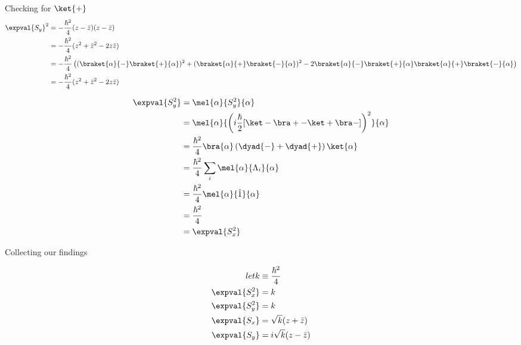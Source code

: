 \begin{answer}
\begin{answerpart}{Checking for \texorpdfstring{$\ket{+}$}{|+>}}
    \begin{equation}
      \begin{split}
        \expval{S_y}^2
        &= -\frac{\hbar^2}{4}(z - \bar{z})(z - \bar{z})\\
        &= -\frac{\hbar^2}{4}(z^2 + \bar{z}^2 - 2z\bar{z})\\
        &= -\frac{\hbar^2}{4}\left(
        (\braket{\alpha}{-}\braket{+}{\alpha})^2
        + (\braket{\alpha}{+}\braket{-}{\alpha})^2
        - 2
        \braket{\alpha}{-}\braket{+}{\alpha}
        \braket{\alpha}{+}\braket{-}{\alpha}
        \right)\\
        &= -\frac{\hbar^2}{4}(z^2 + \bar{z}^2 - 2z\bar{z})\\
      \end{split}
    \end{equation}

    \begin{equation}
      \begin{split}
        \expval{S_y^2}
        &= \mel{\alpha}{S_y^2}{\alpha}\\
        &= \mel{\alpha}{\left(i\frac{\hbar}{2} [\ket - \bra + - \ket + \bra - ]\right)^2}{\alpha}\\
        &=
        \frac{\hbar^2}{4}
        \bra{\alpha}
        \left(
        \dyad{-} + \dyad{+}
        \right)
        \ket{\alpha}
        \\
        &=
        \frac{\hbar^2}{4}
        \sum_i \mel{\alpha}{\Lambda_i}{\alpha}
        \\
        &=
        \frac{\hbar^2}{4}\mel{\alpha}{\hat{1}}{\alpha}
        \\
        &=
        \frac{\hbar^2}{4}
        \\
        &=
        \expval{S_x^2}
        \\
      \end{split}
    \end{equation}

    Collecting our findings
    
    \begin{equation}
      \begin{split}
        let k &\equiv \frac{\hbar^2}{4}\\
        \expval{S_x^2} &= k\\
        \expval{S_y^2} &= k\\
        \expval{S_x} &= \sqrt{k}(z + \bar{z})\\
        \expval{S_y} &= i\sqrt{k}(z - \bar{z})\\
      \end{split}
    \end{equation}


\end{answerpart}
\end{answer}
